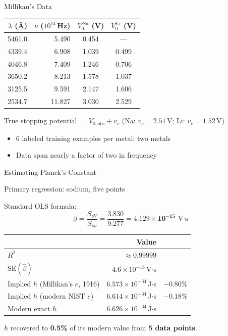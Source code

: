 \documentclass[aspectratio=169]{beamer}
\begin{document}
\begin{frame}{Millikan's Data}

\begin{center}
\begin{tabular}{rrcc}
\toprule
$\lambda$ (\AA) & $\nu$ ($10^{14}$\,Hz)
  & $V_0^{\,\mathrm{Na}}$ (V) & $V_0^{\,\mathrm{Li}}$ (V) \\
\midrule
5461.0 &  5.490 & 0.454  & ---   \\
4339.4 &  6.908 & 1.039  & 0.499 \\
4046.8 &  7.409 & 1.246  & 0.706 \\
3650.2 &  8.213 & 1.578  & 1.037 \\
3125.5 &  9.591 & 2.147  & 1.606 \\
2534.7 & 11.827 & 3.030  & 2.529 \\
\bottomrule
\end{tabular}
\end{center}

\medskip
True stopping potential $= V_{0,\text{obs}} + v_c$
\hspace{1em} (Na: $v_c = 2.51$\,V;\; Li: $v_c = 1.52$\,V)

\medskip
\begin{itemize}
  \item 6 labeled training examples per metal; two metals
  \item Data span nearly a factor of two in frequency
\end{itemize}

\end{frame}

\begin{frame}{Estimating Planck's Constant}

Primary regression: sodium, five points

\medskip
Standard OLS formula:
\[
  \hat\beta = \frac{S_{\nu V}}{S_{\nu\nu}}
            = \frac{3.830}{9.277}
            = \mathbf{4.129\times10^{-15}}\,\text{V$\cdot$s}
\]

\medskip
\begin{center}
\begin{tabular}{p{4.5cm}rr}
\toprule
 & Value & \\
\midrule
$R^2$ & $\approx 0.99999$ & \\
SE$(\hat\beta)$ & $4.6\times10^{-18}$\,V$\cdot$s & \\
Implied $h$ (Millikan's $e$, 1916) & $6.573\times10^{-34}$\,J$\cdot$s & $-0.80\%$ \\
Implied $h$ (modern NIST $e$) & $6.614\times10^{-34}$\,J$\cdot$s & $-0.18\%$ \\
Modern exact $h$ & $6.626\times10^{-34}$\,J$\cdot$s & \\
\bottomrule
\end{tabular}
\end{center}

\medskip
$h$ recovered to \textbf{0.5\%} of its modern value from \textbf{5 data points}.

\end{frame}
\end{document}
